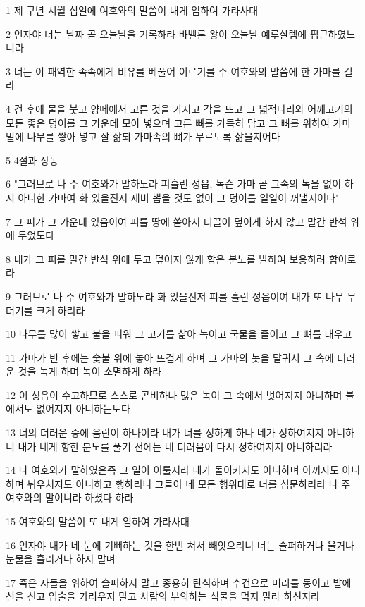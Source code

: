 \par 1 제 구년 시월 십일에 여호와의 말씀이 내게 임하여 가라사대
\par 2 인자야 너는 날짜 곧 오늘날을 기록하라 바벨론 왕이 오늘날 예루살렘에 핍근하였느니라
\par 3 너는 이 패역한 족속에게 비유를 베풀어 이르기를 주 여호와의 말씀에 한 가마를 걸라
\par 4 건 후에 물을 붓고 양떼에서 고른 것을 가지고 각을 뜨고 그 넓적다리와 어깨고기의 모든 좋은 덩이를 그 가운데 모아 넣으며 고른 뼈를 가득히 담고 그 뼈를 위하여 가마 밑에 나무를 쌓아 넣고 잘 삶되 가마속의 뼈가 무르도록 삶을지어다
\par 5 4절과 상동
\par 6 "그러므로 나 주 여호와가 말하노라 피흘린 성읍, 녹슨 가마 곧 그속의 녹을 없이 하지 아니한 가마여 화 있을진저 제비 뽑을 것도 없이 그 덩이를 일일이 꺼낼지어다"
\par 7 그 피가 그 가운데 있음이여 피를 땅에 쏟아서 티끌이 덮이게 하지 않고 말간 반석 위에 두었도다
\par 8 내가 그 피를 말간 반석 위에 두고 덮이지 않게 함은 분노를 발하여 보응하려 함이로라
\par 9 그러므로 나 주 여호와가 말하노라 화 있을진저 피를 흘린 성읍이여 내가 또 나무 무더기를 크게 하리라
\par 10 나무를 많이 쌓고 불을 피워 그 고기를 삶아 녹이고 국물을 졸이고 그 뼈를 태우고
\par 11 가마가 빈 후에는 숯불 위에 놓아 뜨겁게 하며 그 가마의 놋을 달궈서 그 속에 더러운 것을 녹게 하며 녹이 소멸하게 하라
\par 12 이 성읍이 수고하므로 스스로 곤비하나 많은 녹이 그 속에서 벗어지지 아니하며 불에서도 없어지지 아니하는도다
\par 13 너의 더러운 중에 음란이 하나이라 내가 너를 정하게 하나 네가 정하여지지 아니하니 내가 네게 향한 분노를 풀기 전에는 네 더러움이 다시 정하여지지 아니하리라
\par 14 나 여호와가 말하였은즉 그 일이 이룰지라 내가 돌이키지도 아니하며 아끼지도 아니하며 뉘우치지도 아니하고 행하리니 그들이 네 모든 행위대로 너를 심문하리라 나 주 여호와의 말이니라 하셨다 하라
\par 15 여호와의 말씀이 또 내게 임하여 가라사대
\par 16 인자야 내가 네 눈에 기뻐하는 것을 한번 쳐서 빼앗으리니 너는 슬퍼하거나 울거나 눈물을 흘리거나 하지 말며
\par 17 죽은 자들을 위하여 슬퍼하지 말고 종용히 탄식하며 수건으로 머리를 동이고 발에 신을 신고 입술을 가리우지 말고 사람의 부의하는 식물을 먹지 말라 하신지라
